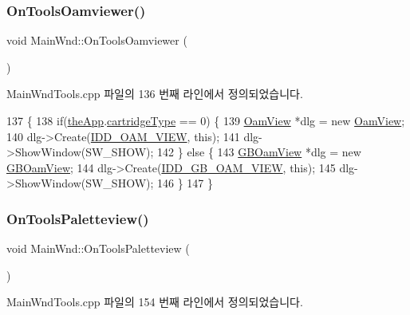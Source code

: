 \subsubsection{\texorpdfstring{On\+Tools\+Oamviewer()}{OnToolsOamviewer()}}
{\footnotesize\ttfamily void Main\+Wnd\+::\+On\+Tools\+Oamviewer (\begin{DoxyParamCaption}{ }\end{DoxyParamCaption})\hspace{0.3cm}{\ttfamily [protected]}}



Main\+Wnd\+Tools.\+cpp 파일의 136 번째 라인에서 정의되었습니다.


\begin{DoxyCode}
137 \{
138   \textcolor{keywordflow}{if}(\mbox{\hyperlink{_v_b_a_8cpp_a8095a9d06b37a7efe3723f3218ad8fb3}{theApp}}.\mbox{\hyperlink{class_v_b_a_af300759fcbc7eeb00ce73f956fc5ddb7}{cartridgeType}} == 0) \{
139     \mbox{\hyperlink{class_oam_view}{OamView}} *dlg = \textcolor{keyword}{new} \mbox{\hyperlink{class_oam_view}{OamView}};
140     dlg->Create(\mbox{\hyperlink{resource_8h_a59bfbec50f1ea97e6ada7678492c9823}{IDD\_OAM\_VIEW}}, \textcolor{keyword}{this});
141     dlg->ShowWindow(SW\_SHOW);
142   \} \textcolor{keywordflow}{else} \{
143     \mbox{\hyperlink{class_g_b_oam_view}{GBOamView}} *dlg = \textcolor{keyword}{new} \mbox{\hyperlink{class_g_b_oam_view}{GBOamView}};
144     dlg->Create(\mbox{\hyperlink{resource_8h_a4181bac198f45f438568253af0ce927b}{IDD\_GB\_OAM\_VIEW}}, \textcolor{keyword}{this});
145     dlg->ShowWindow(SW\_SHOW);
146   \}
147 \}
\end{DoxyCode}
\mbox{\label{class_main_wnd_a0d76be8ae46c1e556ec0323b4373bddc}} 
\subsubsection{\texorpdfstring{On\+Tools\+Paletteview()}{OnToolsPaletteview()}}
{\footnotesize\ttfamily void Main\+Wnd\+::\+On\+Tools\+Paletteview (\begin{DoxyParamCaption}{ }\end{DoxyParamCaption})\hspace{0.3cm}{\ttfamily [protected]}}



Main\+Wnd\+Tools.\+cpp 파일의 154 번째 라인에서 정의되었습니다.



